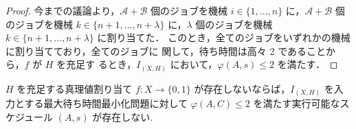 \documentclass[12pt]{optlab-bachelor}
\begin{document}
\begin{proof}
  今までの議論より，$\mathcal{A} + \mathcal{B}$ 個のジョブを機械 $i \in
  \{1,\ldots,n\}$ に，$\mathcal{A} + \mathcal{B}$ 個のジョブを機械 $k \in\{n + 1, \ldots, n + \lambda\}$ に，$\lambda$ 個のジョブを機械 $k \in\{n + 1, \ldots, n + \lambda\}$ に割り当てた．
  このとき，全てのジョブをいずれかの機械に割り当てており，全てのジョブに
  関して，待ち時間は高々 2 であることから，$f$ が $H$ を充足す
  るとき，$I_{(X,H)}$ において，$\varphi(A,s) \le 2$ を満たす．
\end{proof}

\begin{lemma}\label{l_7}
  $H$ を充足する真理値割り当て $f : X \to \{0,1\}$ が存在しないならば，$I_{(X,H)}$ を入力とする最大待ち時間最小化問題に対して
  $\varphi(A, C) \le 2$ を満たす実行可能なス
  ケジュール $(A,s)$ が存在しない.
\end{lemma}
\end{document}
